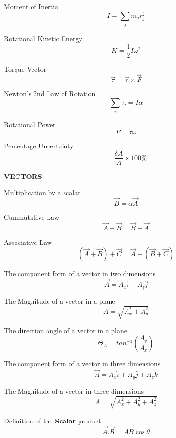 \documentclass[12pt, letterpaper, twoside]{article}
\begin{document}
\bigskip



Moment of Inertia
$$ I = \sum_j m_j r_j^2 $$


Rotational Kinetic Energy
$$ K = \frac{1}{2} I \omega^2 $$


Torque Vector
$$ \overrightarrow{\tau} = \overrightarrow{r} \times \overrightarrow{F}$$



Newton's 2nd Law of Rotation
$$ \sum_i \tau_i = I \alpha $$



Rotational Power
$$ P = \tau \omega $$




\newpage









Percentage Uncertainty 
$$=\frac{\delta A}{A} \times 100\%$$

\vfil


\textbf{VECTORS}
$$  $$

Multiplication by a scalar
$$\overrightarrow{B}=\alpha \overrightarrow{A}$$


Cummutative Law
$$\overrightarrow{A} +\overrightarrow{B} = \overrightarrow{B} + \overrightarrow{A}$$ 


Associative Law
$$(\overrightarrow{A} + \overrightarrow{B}) + \overrightarrow{C} = \overrightarrow{A} + (\overrightarrow{B} + \overrightarrow{C})$$



The component form of a vector in two dimensions
$$\overrightarrow{A} = A_x \hat{i} + A_y \hat{j}$$




The Magnitude of a vector in a plane
$$A = \sqrt{A_x^2 + A_y^2}$$



The direction angle of a vector in a plane
$$\Theta_A = tan^{-1} \left( \frac{A_y}{A_x} \right)$$




The component form of a vector in three dimensions
$$\overrightarrow{A} = A_x \hat{i} + A_y \hat{j} + A_z \hat{k}$$


The Magnitude of a vector in three dimensions
$$A = \sqrt{A_x^2 + A_y^2 + A_z^2}$$



Definition of the \textbf{Scalar} product
$$\overrightarrow{A} . \overrightarrow{B}= AB \cos \theta$$
\end{document}
